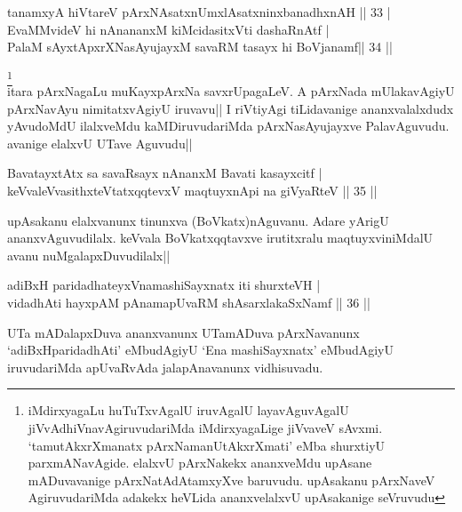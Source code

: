
\begin{shl}
tanamxyA hiVtareV pArxNAsatxnUmxlAsatxninxbanadhxnAH \hfill|| 33 | \\
EvaMMvideV hi nAnananxM kiMcidasitxVti dashaRnAtf | \\
PalaM sAyxtApxrXNasAyujayxM savaRM tasayx hi BoVjanamf\hfill|| 34 || 
\end{shl}

\begin{artha}
\footnote[2]{iMdirxyagaLu huTuTxvAgalU iruvAgalU layavAguvAgalU 
jiVvAdhiVnavAgiruvudariMda iMdirxyagaLige jiVvaveV sAvxmi. 
`tamutAkxrXmanatx pArxNamanUtAkxrXmati' eMba shurxtiyU parxmANavAgide. 
elalxvU pArxNakekx ananxveMdu upAsane mADuvavanige pArxNatAdAtamxyXve 
baruvudu. upAsakanu pArxNaveV AgiruvudariMda adakekx heVLida 
ananxvelalxvU upAsakanige seVruvudu}\\
itara pArxNagaLu muKayxpArxNa savxrUpagaLeV. A pArxNada mUlakavAgiyU 
pArxNavAyu nimitatxvAgiyU iruvavu|| I riVtiyAgi tiLidavanige 
ananxvalalxdudx yAvudoMdU ilalxveMdu kaMDiruvudariMda pArxNasAyujayxve 
PalavAguvudu. avanige elalxvU UTave Aguvudu||
\end{artha}


\begin{shl}
BavatayxtAtx sa savaRsayx nAnanxM Bavati kasayxcitf | \\
keVvaleV\s vasithxteV\s tatxqqtevxV maqtuyxnA\s pi na giVyaRteV \hfill|| 35 || 
\end{shl}

\begin{artha}
upAsakanu elalxvanunx tinunxva (BoVkatx)nAguvanu. Adare yArigU 
ananxvAguvudilalx. keVvala BoVkatxqqtavxve irutitxralu 
maqtuyxviniMdalU avanu nuMgalapxDuvudilalx||
\end{artha}


\begin{shl}
adiBxH paridadhateyxVnamashiSayxnatx iti shurxteVH | \\
vidadhAti hayxpAM pAnamapUvaRM shAsarxlakaSxNamf \hfill|| 36 || 
\end{shl}

\begin{artha}
UTa mADalapxDuva ananxvanunx UTamADuva pArxNavanunx 
`adiBxHparidadhAti' eMbudAgiyU `Ena mashiSayxnatx' eMbudAgiyU 
iruvudariMda apUvaRvAda jalapAnavanunx vidhisuvadu.
\end{artha}

